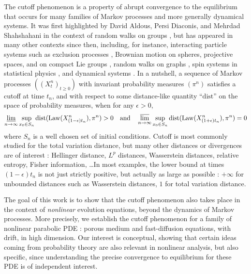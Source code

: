 \documentclass[10pt,reqno]{amsart}
\numberwithin{equation}{section}
\begin{document}
The cutoff phenomenon is a property of abrupt convergence to the equilibrium that occurs for many families of Markov processes and more generally dynamical systems. It was first highlighted by David Aldous, Persi Diaconis, and Mehrdad Shahshahani in the context of random walks on groups \cite{Aldous83, Diaconis96}, but has appeared in many other contexts since then, including, for instance, interacting particle systems such as exclusion processes \cite{Lacoin16}, Brownian motion on spheres, projective spaces, and on compact Lie groups \cite{Meliot14,MR1306030}, random walks on graphs \cite{LuPe16}, spin systems in statistical physics \cite{LuSl13}, and dynamical systems \cite{caputo-labbe-lacoin}. In a nutshell, a sequence of Markov processes $({(X_t^n)}_{t\geq0})$ with invariant probability measures $(\pi^n)$ satisfies a cutoff at time $t_n$, and with respect to some distance-like quantity ``$\mathrm{dist}$'' on the space of probability measures, when for any $\epsilon > 0$, 
\[
\varliminf_{n\to\infty} 
\sup_{x_0\in S_n}\mathrm{dist}(\mathrm{Law}(X^n_{(1-\epsilon)t_n}), \pi^n) > 0
\quad\text{and}\quad
\varlimsup_{n\to\infty} 
\sup_{x_0\in S_n}\mathrm{dist}(\mathrm{Law}(X^n_{(1+\epsilon)t_n}), \pi^n) = 0
\]
where $S_n$ is a well chosen set of initial conditions. Cutoff is most commonly studied for the total variation distance, but many other distances or divergences are of interest : Hellinger distance, $L^p$ distances, Wasserstein distances, relative entropy, Fisher information, \ldots In most examples, the lower bound at times $(1-\epsilon)t_n$ is not just strictly positive, but actually as large as possible : $+\infty$ for unbounded distances such as Wasserstein distances, $1$ for total variation distance. 

The goal of this work is to show that the cutoff phenomenon also takes place in the context of \emph{nonlinear} evolution equations, beyond the dynamics of Markov processes. More precisely, we establish the cutoff phenomenon for a family of nonlinear parabolic PDE : porous medium and fast-diffusion equations, with drift, in high dimension. Our interest is conceptual, showing that certain ideas coming from probability theory are also relevant in nonlinear analysis, but also specific, since understanding the precise convergence to equilibrium for these PDE is of independent interest. 
\end{document}
